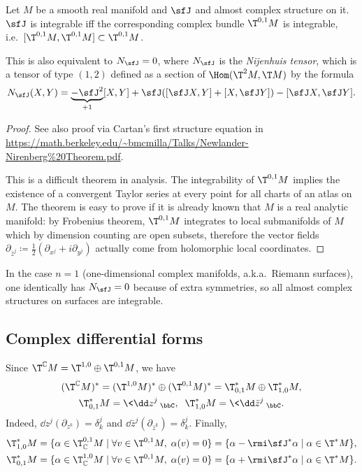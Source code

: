 \begin{thm}
    Let $M$ be a smooth real manifold and $\sfJ$ and almost complex structure on it. $\sfJ$ is integrable iff the corresponding complex bundle $\T^{0,1}M$ is integrable, i.e.\ $[\T^{0,1}M,\T^{0,1}M]\subset \T^{0,1}M$.
    
    This is also equivalent to $N_\sfJ=0$, where $N_\sfJ$ is the \emph{Nijenhuis tensor}, which is a tensor of type $(1,2)$ defined as a section of $\Hom(\T^2M,\T M)$ by the formula
    \[N_\sfJ(X,Y)=\underbrace{-\sfJ^2}_{+1}[X,Y]+\sfJ([\sfJ X,Y]+[X,\sfJ Y])-[\sfJ X,\sfJ Y].\]
\end{thm}
\begin{proof}
    See also proof via Cartan's first structure equation  in \url{https://math.berkeley.edu/~bmcmilla/Talks/Newlander-Nirenberg%20Theorem.pdf}.
    
    This is a difficult theorem in analysis. The integrability of $\T^{0,1}M$ implies the existence of a convergent Taylor series at every point for all charts of an atlas on $M$. The theorem is easy to prove if it is already known that $M$ is a real analytic manifold: by Frobenius theorem, $\T^{0,1}M$ integrates to local submanifolds of $M$ which by dimension counting are open subsets, therefore the vector fields $\partial_{\bar z^j}\coloneqq\frac12(\partial_{x^j}+i\partial_{y^j})$ actually come from holomorphic local coordinates.
\end{proof}

\begin{rem}
    In the case $n=1$ (one-dimensional complex manifolds, a.k.a.\ Riemann surfaces), one identically has $N_\sfJ=0$ because of extra symmetries, so all almost complex structures on surfaces are integrable.
\end{rem}





\subsection{Complex differential forms}

Since $\T^\mathbb{C}M=\T^{1,0}\oplus \T^{0,1}M$, we have
\begin{gather}
    (\T^\mathbb{C}M)^\ast=(\T^{1,0}M)^\ast \oplus (\T^{0,1}M)^\ast=\T^\ast_{0,1}M\oplus \T^\ast_{1,0}M,\\ \T^\ast_{0,1}M=\<\dd z^j\>_\bbC,\;\; \T^\ast_{1,0}M=\<\dd\bar z^j\>_\bbC.
\end{gather}
Indeed, $\dd z^j(\partial_{z^k})=\delta^j_k$ and $\dd \bar z^j (\partial_{\bar z^k})=\delta^j_k$.
Finally, 
\begin{align}
    \T^\ast_{1,0}M=\{\alpha\in \T^{0,1}_{\mathbb{C}}M\mid \forall v\in \T^{0,1}M,\; \alpha(v)=0\}=\{\alpha-\rmi\sfJ^\ast\alpha\mid \alpha\in \T^\ast M\},\\
    \T^\ast_{0,1}M=\{\alpha\in \T^{1,0}_{\mathbb{C}}M\mid \forall v\in \T^{0,1}M,\; \alpha(v)=0\}=\{\alpha+\rmi\sfJ^\ast\alpha\mid \alpha\in \T^\ast M\}.
\end{align}

